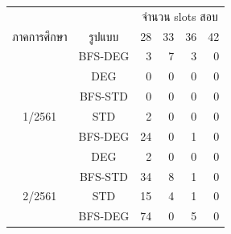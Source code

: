 \begin{table}[]
    \centering
    \begin{tabular}{@{}ccrrrr@{}}
    \toprule
                                  &                            & \multicolumn{4}{c}{จำนวน slots สอบ}                                                                         \\ \cmidrule(l){3-6} 
    \multirow{-2}{*}{ภาคการศึกษา} & \multirow{-2}{*}{รูปแบบ}   & 28                        & 33                       & 36                       & 42                       \\ \midrule
                                  & BFS-DEG                    & 3                         & 7                        & 3                        & 0                        \\ \cmidrule(l){2-6} 
                                  & {\color[HTML]{FE0000} DEG} & {\color[HTML]{FE0000} 0}  & {\color[HTML]{FE0000} 0} & {\color[HTML]{FE0000} 0} & {\color[HTML]{FE0000} 0} \\ \cmidrule(l){2-6} 
                                  & BFS-STD                    & 0                         & 0                        & 0                        & 0                        \\ \cmidrule(l){2-6} 
    \multirow{-4}{*}{1/2561}      & STD                        & 2                         & 0                        & 0                        & 0                        \\ \midrule
                                  & BFS-DEG                    & 24                        & 0                        & 1                        & 0                        \\ \cmidrule(l){2-6} 
                                  & {\color[HTML]{FE0000} DEG} & {\color[HTML]{FE0000} 2}  & {\color[HTML]{FE0000} 0} & {\color[HTML]{FE0000} 0} & {\color[HTML]{FE0000} 0} \\ \cmidrule(l){2-6} 
                                  & BFS-STD                    & 34                        & 8                        & 1                        & 0                        \\ \cmidrule(l){2-6} 
    \multirow{-4}{*}{2/2561}      & STD                        & 15                        & 4                        & 1                        & 0                        \\ \midrule
                                  & BFS-DEG                    & 74                        & 0                        & 5                        & 0                        \\ \cmidrule(l){2-6} 

\end{tabular}
\end{table}
